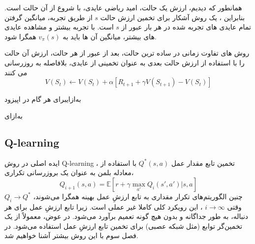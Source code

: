 همانطور که دیدیم، ارزش یک حالت، امید ریاضی عایدی، با شروع از آن حالت است.
بنابراین ، یک روش آشکار برای تخمین ارزش حالت $s$ از طریق تجربه، میانگین گرفتن تمام عایدی های تجربه شده در هر بار عبور از $s$ است.
با تجربه بیشتر و مشاهده عایدی های بیشتر، میانگین آن ها باید به $v_\pi(s)$ همگرا شود.

روش های تفاوت زمانی در ساده ترین حالت، بعد از عبور از هر حالت، ارزش آن حالت را با استفاده از ارزش حالت بعدی به عنوان تخمینی از عایدی، بلافاصله به روزرسانی می کنند
$$V(S_t) \longleftarrow V(S_t) + \alpha\left[R_{t+1} + \gamma V(S_{t+1}) - V(S_t)\right]$$

\‌به‌ازای{برای هر گام در اپیزود}

‌به‌ازای


\subsection{Q-learning}
ایده اصلی در روش 
Q-learning
، تخمین تابع مقدار عمل  
$Q^*(s,a)$ 
با استفاده از معادله بلمن به عنوان یک بروزرسانی تکراری،
$$Q_{i+1}(s,a) = \mathbb{E}[r+ \gamma \max_{a'} Q_i(s',a')|s,a]$$
چنین الگوریتم‌های تکرار مقداری به تابع ارزشِ عمل بهینه همگرا می‌شوند، 
$Q_i \longrightarrow Q^*$
وقتی
$i \longrightarrow \infty$
، این رویکرد کلی کاملا غیر عملی است.
زیرا تابع ارزشِ عمل برای هر دنباله، به طور جداگانه و بدون هیچ گونه تعمیم برآورد می‌شود. در عوض، معمولاً از یک تخمین‌گر توابع (مثل شبکه عصبی) برای تخمین تابع ارزشِ عمل استفاده می‌شود. در فصل سوم با این روش بیشتر آشنا خواهیم شد.